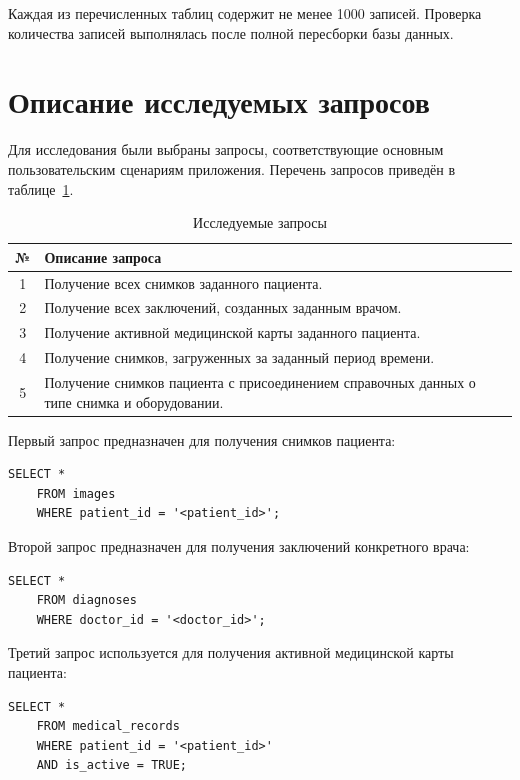 Каждая из перечисленных таблиц содержит не менее 1000 записей. Проверка количества записей выполнялась после полной пересборки базы данных.

\section{Описание исследуемых запросов}

Для исследования были выбраны запросы, соответствующие основным пользовательским сценариям приложения. Перечень запросов приведён в таблице~\ref{tbl:research-queries}.

\begin{table}[H]
	\centering
	\caption{Исследуемые запросы}
	\label{tbl:research-queries}
	\small
	\begin{tabularx}{\textwidth}{|c|X|}
		\hline
		\textbf{№} & \textbf{Описание запроса} \\
		\hline
		1 & Получение всех снимков заданного пациента. \\
		\hline
		2 & Получение всех заключений, созданных заданным врачом. \\
		\hline
		3 & Получение активной медицинской карты заданного пациента. \\
		\hline
		4 & Получение снимков, загруженных за заданный период времени. \\
		\hline
		5 & Получение снимков пациента с присоединением справочных данных о типе снимка и оборудовании. \\
		\hline
	\end{tabularx}
\end{table}

Первый запрос предназначен для получения снимков пациента:

\clearpage

\begin{lstlisting}[caption={Получение снимков пациента}]
	SELECT *
	FROM images
	WHERE patient_id = '<patient_id>';
\end{lstlisting}

Второй запрос предназначен для получения заключений конкретного врача:

\begin{lstlisting}[caption={Получение заключений врача}]
	SELECT *
	FROM diagnoses
	WHERE doctor_id = '<doctor_id>';
\end{lstlisting}

Третий запрос используется для получения активной медицинской карты пациента:

\begin{lstlisting}[caption={Получение активной медицинской карты пациента}]
	SELECT *
	FROM medical_records
	WHERE patient_id = '<patient_id>'
	AND is_active = TRUE;
\end{lstlisting}

